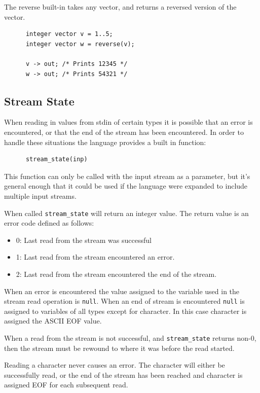 \documentclass{article}
\begin{document}
    The reverse built-in takes any vector, and returns a reversed version of the vector.

    \begin{lstlisting}
      integer vector v = 1..5;
      integer vector w = reverse(v);

      v -> out; /* Prints 12345 */
      w -> out; /* Prints 54321 */
    \end{lstlisting}

  \subsection{Stream State}\label{sec:streamState}
    When reading in values from stdin of certain types it is possible that an error is encountered, or that the end
    of the stream has been encountered. In order to handle these situations the language provides a built in
    function:

    \begin{lstlisting}
      stream_state(inp)
    \end{lstlisting}

    This function can only be called with the input stream as a parameter, but it's general enough that it could be
    used if the language were expanded to include multiple input streams.

    When called \texttt{stream\_state} will return an integer value. The return value is an error code defined as
    follows:

    \begin{itemize}
      \item 0: Last read from the stream was successful
      \item 1: Last read from the stream encountered an error.
      \item 2: Last read from the stream encountered the end of the stream.
    \end{itemize}

    When an error is encountered the value assigned to the variable used in the stream read operation is
    \texttt{null}. When an end of stream is encountered \texttt{null} is assigned to variables of all types except
    for character. In this case character is assigned the ASCII EOF value.

    When a read from the stream is not successful, and \texttt{stream\_state} returns non-0, then the stream must be
    rewound to where it was before the read started.

    Reading a character never causes an error. The character will either be successfully read, or the end of the
    stream has been reached and character is assigned EOF for each subsequent read.
\end{document}
